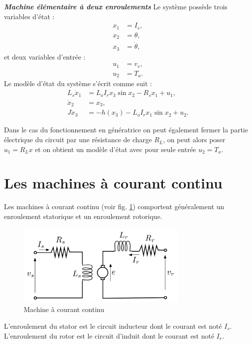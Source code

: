 \begin{exemple}{\bf \em Machine élémentaire à deux enroulements}
Le système possède trois variables d'état :
\begin{equation*} \begin{split}
x_1 &= I_s, \\
x_2 &= \theta, \\
x_3 &= \dot \theta,
\end{split} \end{equation*}
et deux variables d'entrée :
\begin{equation*} \begin{split}
u_1 &= v_s, \\
u_2 &= T_a.
\end{split} \end{equation*}
Le modèle d'état du système s'écrit comme suit :
\begin{align*}
L_s\dot x_1 &= L_oI_rx_3 \sin x_2 - R_s x_1 + u_1, \\
\dot x_2 &= x_3, \\
J\dot x_3 &= -h(x_3) - L_oI_rx_1 \sin x_2 + u_2.
\end{align*}

Dans le cas du fonctionnement en génératrice on peut également fermer la partie électrique du circuit par une résistance de charge $R_L$, on peut alors poser $u_1=R_L x$ et on obtient un modèle d'état avec pour seule entrée $u_2=T_a$.

\cqfd



\end{exemple}

\section{Les machines à courant continu}


Les machines à courant continu (voir fig.
\ref{fig:machineDC}) comportent généralement un enroulement statorique
et un enroulement rotorique.  
\begin{figure}[t]
\begin{center}
\includegraphics[height=4cm]{machineDC}
\caption{Machine à courant continu}
\label{fig:machineDC}
\end{center}
\end{figure}
L'enroulement du stator est le circuit
inducteur dont le courant est noté $I_s$.  L'enroule\-ment du rotor
est le circuit d'induit dont le courant est noté $I_r$. 

